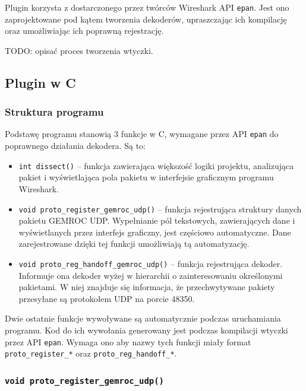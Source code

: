 \documentclass[a4paper, 12pt, twoside, openright]{article}
\begin{document}
Plugin korzysta z dostarczonego przez twórców Wireshark API \texttt{epan}. Jest ono zaprojektowane pod kątem tworzenia dekoderów,
upraszczając ich kompilację oraz umożliwiając ich poprawną rejestrację.

TODO: opisać proces tworzenia wtyczki.

\subsection{Plugin w C}
\indent\par
\subsubsection{Struktura programu}

\indent\par
Podstawę programu stanowią 3 funkcje w C, wymagane przez API \texttt{epan} do poprawnego działania dekodera. Są to:
\begin{itemize}
	\item \texttt{int dissect()} -- funkcja zawierająca większość logiki projektu, analizująca pakiet i wyświetlająca
		pola pakietu w interfejsie graficznym programu Wireshark.
	\item \texttt{void proto\_register\_gemroc\_udp()} -- funkcja rejestrująca struktury danych pakietu GEMROC UDP.
		Wypełnianie pól tekstowych, zawierających dane i wyświetlanych przez interfejs graficzny, jest częściowo
		automatyczne. Dane zarejestrowane dzięki tej funkcji umożliwiają tą automatyzację.
	\item \texttt{void proto\_reg\_handoff\_gemroc\_udp()} -- funkcja rejestrująca dekoder. Informuje ona dekoder wyżej
		w hierarchii o zainteresowaniu określonymi pakietami. W niej znajduje się informacja, że przechwytywane pakiety
		przesyłane są protokołem UDP na porcie 48350.
\end{itemize}

Dwie ostatnie funkcje wywoływane są automatycznie podczas uruchamiania programu. Kod do ich wywołania generowany jest
podczas kompilacji wtyczki przez API \texttt{epan}. Wymaga ono aby nazwy tych funkcji miały format \texttt{proto\_register\_*} oraz
\texttt{proto\_reg\_handoff\_*}.

\subsubsection{\texttt{void proto\_register\_gemroc\_udp()}}
\end{document}
